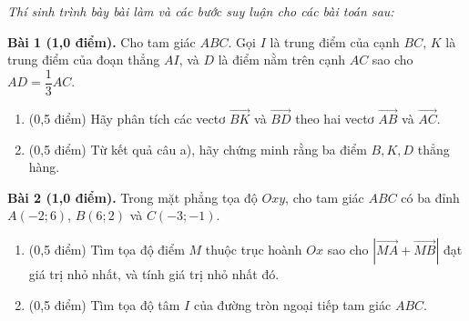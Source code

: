 \documentclass[10pt,a4paper]{article}
\newcommand{\parttitle}[1]{\par\vspace{3.5pt}\needspace{3\baselineskip}{\large\bfseries\color{ink}#1}\par\nopagebreak\vspace{2pt}}
\begin{document}
\vspace{3pt}
\parttitle{PHẦN IV. Tự luận}
\textit{Thí sinh trình bày bài làm và các bước suy luận cho các bài toán sau:}

\vspace{4pt}
\textbf{Bài 1 (1,0 điểm).} Cho tam giác $ABC$. Gọi $I$ là trung điểm của cạnh $BC$, $K$ là trung điểm của đoạn thẳng $AI$, và $D$ là điểm nằm trên cạnh $AC$ sao cho $AD = \dfrac{1}{3}AC$.
\begin{enumerate}[label=\alph*), itemsep=2pt]
    \item (0,5 điểm) Hãy phân tích các vectơ $\vec{BK}$ và $\vec{BD}$ theo hai vectơ $\vec{AB}$ và $\vec{AC}$.
    \item (0,5 điểm) Từ kết quả câu a), hãy chứng minh rằng ba điểm $B, K, D$ thẳng hàng.
\end{enumerate}

\vspace{6pt}
\textbf{Bài 2 (1,0 điểm).} Trong mặt phẳng tọa độ $Oxy$, cho tam giác $ABC$ có ba đỉnh $A(-2; 6)$, $B(6; 2)$ và $C(-3; -1)$.
\begin{enumerate}[label=\alph*), itemsep=2pt]
    \item (0,5 điểm) Tìm tọa độ điểm $M$ thuộc trục hoành $Ox$ sao cho $|\vec{MA} + \vec{MB}|$ đạt giá trị nhỏ nhất, và tính giá trị nhỏ nhất đó.
    \item (0,5 điểm) Tìm tọa độ tâm $I$ của đường tròn ngoại tiếp tam giác $ABC$.
\end{enumerate}
\end{document}
